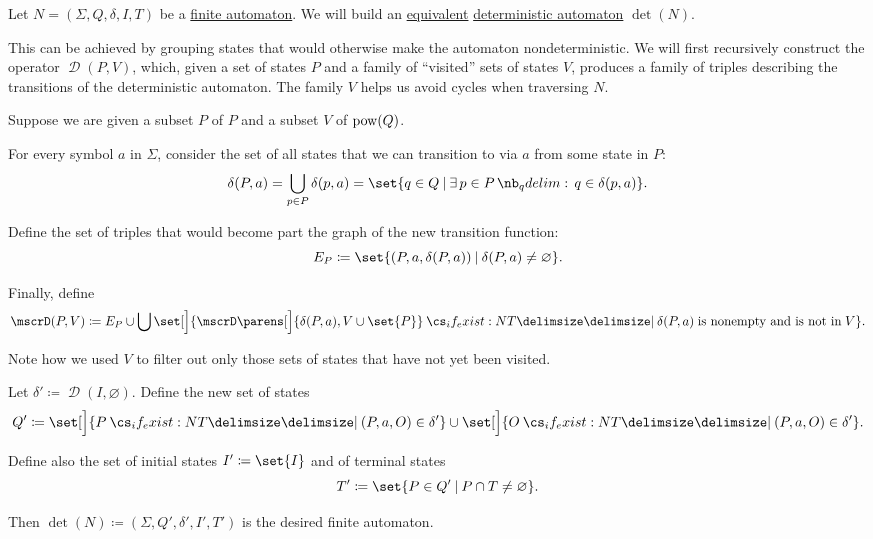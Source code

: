 \begin{algorithm}\label{alg:determinization_of_finite_automata}
  Let \( N = (\Sigma, Q, \delta, I, T) \) be a \hyperref[def:finite_automaton]{finite automaton}. We will build an \hyperref[def:finite_automaton/equivalent]{equivalent} \hyperref[def:finite_automaton/determinism]{deterministic automaton} \( \det(N) \).

  This can be achieved by grouping states that would otherwise make the automaton nondeterministic. We will first recursively construct the operator \( \mscrD(P, V) \), which, given a set of states \( P \) and a family of \enquote{visited} sets of states \( V \), produces a family of triples describing the transitions of the deterministic automaton. The family \( V \) helps us avoid cycles when traversing \( N \).

  \begin{thmenum}
     Suppose we are given a subset \( P \) of \( P \) and a subset \( V \) of \( \operatorname{pow}(Q) \).

    For every symbol \( a \) in \( \Sigma \), consider the set of all states that we can transition to via \( a \) from some state in \( P \):
    \begin{equation*}
      \delta(P, a) = \bigcup_{p \in P} \delta(p, a) = \set{ q \in Q \given \qexists* {p \in P} q \in \delta(p, a) }.
    \end{equation*}

    Define the set of triples that would become part the graph of the new transition function:
    \begin{equation*}
      E_P \coloneqq \set{ (P, a, \delta(P, a)) \given \delta(P, a) \neq \varnothing }.
    \end{equation*}

    Finally, define
    \begin{equation*}
      \mscrD(P, V) \coloneqq E_P \cup \bigcup \set[\Big]{ \mscrD\parens[\Big]{ \delta(P, a), V \cup \set{ P } } \given* \delta(P, a) \T{is nonempty and is not in} V }.
    \end{equation*}

    Note how we used \( V \) to filter out only those sets of states that have not yet been visited.

     Let \( \delta' \coloneqq \mscrD(I, \varnothing) \). Define the new set of states
    \begin{equation*}
      Q' \coloneqq \set[\Big]{ P \given* (P, a, O) \in \delta' } \cup \set[\Big]{ O \given* (P, a, O) \in \delta' }.
    \end{equation*}

    Define also the set of initial states \( I' \coloneqq \set{ I } \) and of terminal states
    \begin{equation*}
      T' \coloneqq \set{ P \in Q' \given P \cap T \neq \varnothing }.
    \end{equation*}

    Then \( \det(N) \coloneqq (\Sigma, Q', \delta', I', T') \) is the desired finite automaton.
  \end{thmenum}
\end{algorithm}

